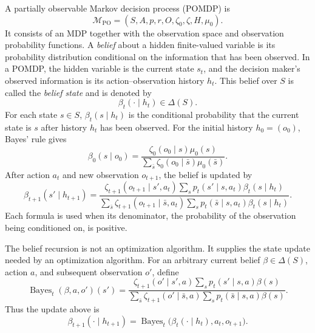 A partially observable Markov decision process (POMDP) is
\[
    \mathcal{M}_{\mathrm{PO}}=(S,A,p,r,O,\zeta_0,\zeta,H,\mu_0).
\]
It consists of an MDP together with the observation space and observation probability functions. A \emph{belief} about a hidden finite-valued variable is its probability distribution conditional on the information that has been observed. In a POMDP, the hidden variable is the current state $s_t$, and the decision maker's observed information is its action--observation history $h_t$. This belief over $S$ is called the \emph{belief state} and is denoted by
\[
    \beta_t(\cdot\mid h_t)\in\Delta(S).
\]
For each state $s\in S$, $\beta_t(s\mid h_t)$ is the conditional probability that the current state is $s$ after history $h_t$ has been observed.
For the initial history $h_0=(o_0)$, Bayes' rule gives
\[
    \beta_0(s\mid o_0)
    =
    \frac{
      \zeta_0(o_0\mid s)\mu_0(s)
    }{
      \sum_{\bar s}\zeta_0(o_0\mid\bar s)\mu_0(\bar s)
    }.
\]
After action $a_t$ and new observation $o_{t+1}$, the belief is updated by
\[
    \beta_{t+1}(s'\mid h_{t+1})
    =
    \frac{
      \zeta_{t+1}(o_{t+1}\mid s',a_t)
      \sum_s p_t(s'\mid s,a_t)\beta_t(s\mid h_t)
    }{
      \sum_{\bar s}
      \zeta_{t+1}(o_{t+1}\mid\bar s,a_t)
      \sum_s p_t(\bar s\mid s,a_t)\beta_t(s\mid h_t)
    }.
\]
Each formula is used when its denominator, the probability of the observation being conditioned on, is positive.

The belief recursion is not an optimization algorithm. It supplies the state update needed by an optimization algorithm. For an arbitrary current belief $\beta\in\Delta(S)$, action $a$, and subsequent observation $o'$, define
\[
    \operatorname{Bayes}_t(\beta,a,o')(s')
    =
    \frac{
      \zeta_{t+1}(o'\mid s',a)
      \sum_s p_t(s'\mid s,a)\beta(s)
    }{
      \sum_{\bar s}
      \zeta_{t+1}(o'\mid\bar s,a)
      \sum_s p_t(\bar s\mid s,a)\beta(s)
    }.
\]
Thus the update above is
\[
    \beta_{t+1}(\cdot\mid h_{t+1})
    =
    \operatorname{Bayes}_t
    \bigl(\beta_t(\cdot\mid h_t),a_t,o_{t+1}\bigr).
\]

